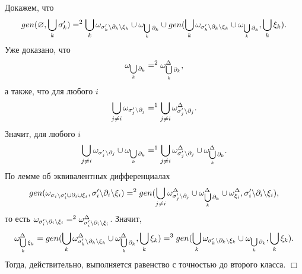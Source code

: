 Докажем, что $$gen(\varnothing, \bigcup\limits_k {\sigma^\prime_k}) =^2 \bigcup\limits_k \omega_{{\sigma^\prime_k}{\setminus}{\partial_k}{\setminus}{\xi_k}} \cup \omega_{\bigcup\limits_k \partial_k} \cup gen(\bigcup\limits_k \omega_{{\sigma^\prime_k}{\setminus}{\partial_k}{\setminus}{\xi_k}} \cup \omega_{\bigcup\limits_k \partial_k}, \bigcup\limits_k {\xi_k}).$$ 
Уже доказано, что $$\omega_{\bigcup\limits_k {\partial_k}} =^2 \omega^\Delta_{\bigcup\limits_k {\partial_k}},$$ 
а также, что для любого $i$ $$\bigcup\limits_{j \neq i} \omega_{{\sigma^\prime_j}{\setminus}{\partial_j}} =^1 \bigcup\limits_{j \neq i} \omega^\Delta_{{\sigma^\prime_j}{\setminus}{\partial_j}}.$$ 
Значит, для любого $i$ $$\bigcup\limits_{j \neq i} \omega_{{\sigma^\prime_j}{\setminus}{\partial_j}} \cup \omega_{\bigcup\limits_k {\partial_k}} =^1 \bigcup\limits_{j \neq i} \omega^\Delta_{{\sigma^\prime_j}{\setminus}{\partial_j}} \cup \omega^\Delta_{\bigcup\limits_k {\partial_k}}.$$ 
По лемме об эквивалентных дифференциалах $$gen(\omega_{{\sigma_i}{\setminus}{\sigma^\prime_i} \cup {\partial_i} \cup {\xi_i}}, {\sigma^\prime_i}{\setminus}{\partial_i}{\setminus}{\xi_i}) =^2 gen(\bigcup\limits_{j \neq i} \omega^\Delta_{{\sigma^\prime_j}{\setminus}{\partial_j}} \cup \omega^\Delta_{\bigcup\limits_k {\partial_k}} \cup \omega^\Delta_{\xi_i}, {\sigma^\prime_i}{\setminus}{\partial_i}{\setminus}{\xi_i}),$$ 
то есть $\omega_{{\sigma^\prime_i}{\setminus}{\partial_i}{\setminus}{\xi_i}} =^2 \omega^\Delta_{{\sigma^\prime_i}{\setminus}{\partial_i}{\setminus}{\xi_i}}$. Значит, $$\omega^\Delta_{\bigcup\limits_k {\xi_k}} = gen(\bigcup\limits_k \omega^\Delta_{{\sigma^\prime_k}{\setminus}{\partial_k}{\setminus}{\xi_k}} \cup \omega^\Delta_{\bigcup\limits_k {\partial_k}}, \bigcup\limits_k {\xi_k}) =^3 gen(\bigcup\limits_k \omega_{{\sigma^\prime_k}{\setminus}{\partial_k}{\setminus}{\xi_k}} \cup \omega_{\bigcup\limits_k {\partial_k}}, \bigcup\limits_k {\xi_k}).$$ 
Тогда, действительно, выполняется равенство с точностью до второго класса. $\Box$\\
